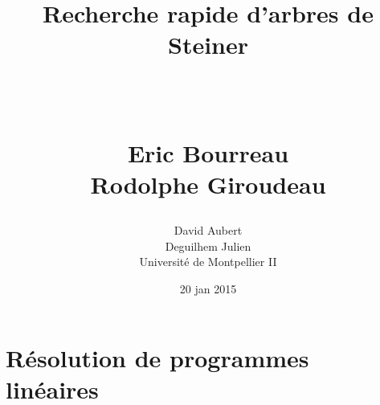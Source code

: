\documentclass[paper=a4, fontsize=11pt]{scrartcl}	%
\title{ \vspace{-1in} 	\usefont{OT1}{bch}{b}{n}
		\huge \strut Recherche rapide d'arbres de Steiner \strut \\
		\Large \bfseries \strut Eric Bourreau \\ Rodolphe Giroudeau \strut
}
\author{ 									
	\usefont{OT1}{bch}{m}{n} David Aubert\\		
	\usefont{OT1}{bch}{m}{n} Deguilhem Julien\\		
	\usefont{OT1}{bch}{m}{n}Université de  Montpellier II\\	
}
\date{20 jan 2015}
\numberwithin{equation}{section}															%
\numberwithin{figure}{section}																%
\numberwithin{table}{section}																%
\begin{document}
\maketitle

\section{Résolution de programmes linéaires}







\iffalse
\section{Génération de colonne}
\begin{hspace}{1cm}
La génération
\end{hspace}
de colonne est une méthode pour résoudre les programmes linéaires de grande taille. Pierre Courteille étudiant le sujet, une collaboration sera effectué. Mais les motivations et les interêts sont grand en effet, les approximations succéssives faites pourront être résolues par cette méthode. Une implémentation du simplex ou par combinaison linéaire pourra être faite.


\section{Recherche et approximation}
\begin{hspace}{1cm}
	Le but de ce TER
\end{hspace}
n'est pas de trouvé la solution optimal mais une solution rapide. Une étude sera faite pour déterminer la k-approximation. Lorsque  nous en avons parlé le k varier entre [2..3].
\newline
Ensuite il faudra se décider entre la programmation linéaire, dynamique et par contrainte. Après une sommaire étude entre ces trois éléments, nous pensons que le plus efficace sera la programmation dynamique (A confirmer).



\section{Initialisation}
\begin{hspace}{1cm}
	Ensuite une 
\end{hspace}
des manières de construire un arbre de Steiner serait en suivant l'exemple de la sélection naturelle. Il faudrait construire un réseau génétique afin de faire hériter à chague génération les meilleurs éléments de la précédente. En effet cela semble être une méthode efficace et naturel. De plus, cela semblerait correspondre au type de programmation choisi, pour le moment dynamique.
\newline
Il faudra pouvoir trouver une heuristique efficace pour générer un ensemble déjà suffisament adapté afin de trouver un nombre de génération d'individu minimal.
\fi
\end{document}
